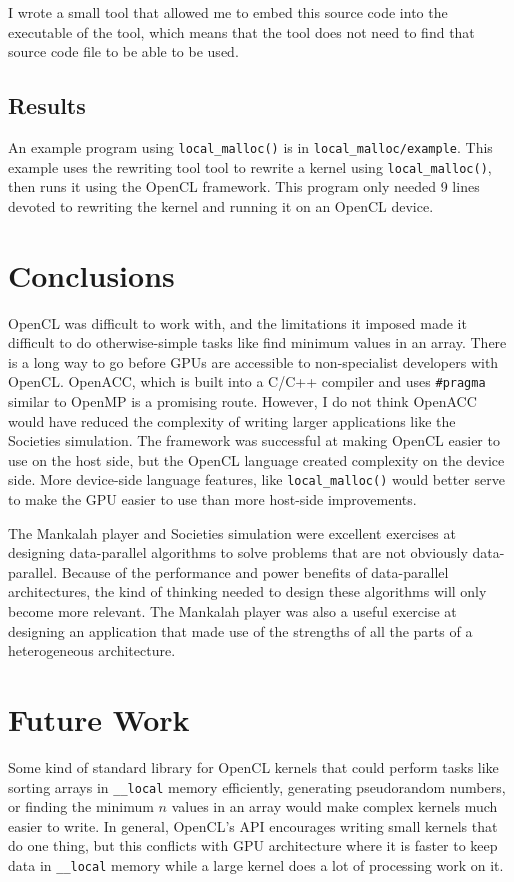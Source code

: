 \documentclass{article}
\begin{document}
I wrote a small tool that allowed me to embed this source code into the executable of the tool, which means that the tool does not need to find that source code file to be able to be used.

\subsection{Results}
An example program using \texttt{local\_malloc()} is in \texttt{local\_malloc/example}. This example uses the rewriting tool tool to rewrite a kernel using \texttt{local\_malloc()}, then runs it using the OpenCL framework. This program only needed 9 lines devoted to rewriting the kernel and running it on an OpenCL device.

\section{Conclusions}
OpenCL was difficult to work with, and the limitations it imposed made it difficult to do otherwise-simple tasks like find minimum values in an array. There is a long way to go before GPUs are accessible to non-specialist developers with OpenCL. OpenACC, which is built into a C/C++ compiler and uses \texttt{\#pragma} similar to OpenMP is a promising route. However, I do not think OpenACC would have reduced the complexity of writing larger applications like the Societies simulation. The framework was successful at making OpenCL easier to use on the host side, but the OpenCL language created complexity on the device side. More device-side language features, like \texttt{local\_malloc()} would better serve to make the GPU easier to use than more host-side improvements.

The Mankalah player and Societies simulation were excellent exercises at designing data-parallel algorithms to solve problems that are not obviously data-parallel. Because of the performance and power benefits of data-parallel architectures, the kind of thinking needed to design these algorithms will only become more relevant. The Mankalah player was also a useful exercise at designing an application that made use of the strengths of all the parts of a heterogeneous architecture. 

\section{Future Work}
Some kind of standard library for OpenCL kernels that could perform tasks like sorting arrays in \texttt{\_\_local} memory efficiently, generating pseudorandom numbers, or finding the minimum $n$ values in an array would make complex kernels much easier to write. In general, OpenCL's API encourages writing small kernels that do one thing, but this conflicts with GPU architecture where it is faster to keep data in \texttt{\_\_local} memory while a large kernel does a lot of processing work on it.
\end{document}
